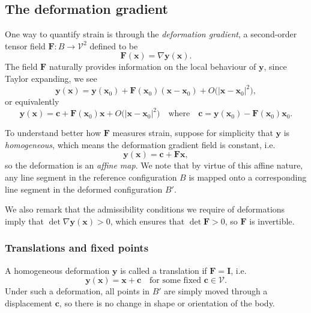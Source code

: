 \documentclass[
  letterpaper,
  DIV=11,
  numbers=noendperiod]{scrreprt}
\theoremstyle{plain}
\theoremstyle{remark}
\begin{document}
\subsection{The deformation gradient}\label{the-deformation-gradient}

One way to quantify strain is through the \emph{deformation gradient}, a
second-order tensor field \({\boldsymbol{F}}:B\to{\mathcal{V}}^2\)
defined to be
\[{\boldsymbol{F}}({\boldsymbol{x}}) = \nabla {\boldsymbol{y}}({\boldsymbol{x}}).\]
The field \({\boldsymbol{F}}\) naturally provides information on the
local behaviour of \({\boldsymbol{y}}\), since Taylor expanding, we see
\[{\boldsymbol{y}}({\boldsymbol{x}}) = {\boldsymbol{y}}({\boldsymbol{x}}_0) +{\boldsymbol{F}}({\boldsymbol{x}}_0)({\boldsymbol{x}}-{\boldsymbol{x}}_0)+{O}\big(|{\boldsymbol{x}}-{\boldsymbol{x}}_0|^2\big),\]
or equivalently
\[{\boldsymbol{y}}({\boldsymbol{x}}) = {\boldsymbol{c}}+{\boldsymbol{F}}({\boldsymbol{x}}_0){\boldsymbol{x}}+{O}\big(|{\boldsymbol{x}}-{\boldsymbol{x}}_0|^2\big)\quad\text{where}\quad {\boldsymbol{c}}= {\boldsymbol{y}}({\boldsymbol{x}}_0)-{\boldsymbol{F}}({\boldsymbol{x}}_0){\boldsymbol{x}}_0.\]

To understand better how \({\boldsymbol{F}}\) measures strain, suppose
for simplicity that \({\boldsymbol{y}}\) is \emph{homogeneous}, which
means the deformation gradient field is constant,
i.e.~\[{\boldsymbol{y}}({\boldsymbol{x}}) = {\boldsymbol{c}}+ {\boldsymbol{F}}{\boldsymbol{x}},\]
so the deformation is an \emph{affine map}. We note that by virtue of
this affine nature, any line segment in the reference configuration
\(B\) is mapped onto a corresponding line segment in the deformed
configuration \(B'\).

We also remark that the admissibility conditions we require of
deformations imply that
\(\det\nabla{\boldsymbol{y}}({\boldsymbol{x}})>0\), which ensures that
\(\det{\boldsymbol{F}}>0\), so \({\boldsymbol{F}}\) is invertible.

\subsubsection{Translations and fixed
points}\label{translations-and-fixed-points}

A homogeneous deformation \({\boldsymbol{y}}\) is called a translation
if \({\boldsymbol{F}}={\boldsymbol{I}}\),
i.e.~\[{\boldsymbol{y}}({\boldsymbol{x}}) = {\boldsymbol{x}}+{\boldsymbol{c}}\quad\text{for some fixed }{\boldsymbol{c}}\in{\mathcal{V}}.\]
Under such a deformation, all points in \(B'\) are simply moved through
a displacement \({\boldsymbol{c}}\), so there is no change in shape or
orientation of the body.
\end{document}
